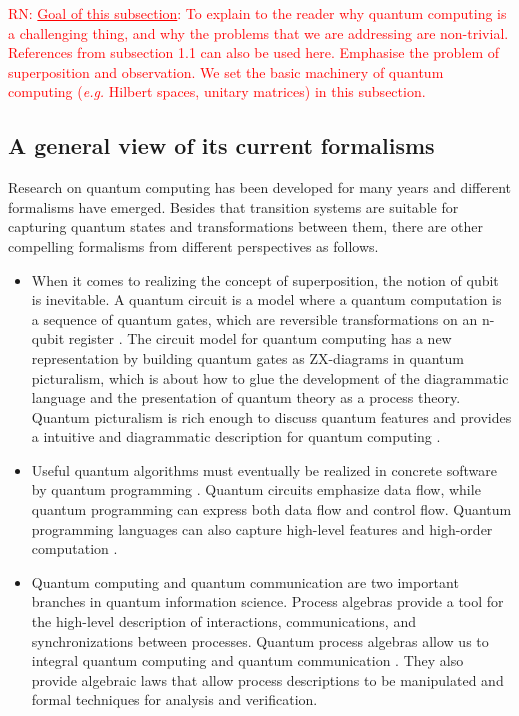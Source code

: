 \documentclass[a4paper, 11pt]{article}
\newcommand{\nevComment}[1]{\textcolor{red}{RN: #1}}
\begin{document}
\nevComment{\underline{Goal of this subsection}: To explain to the
  reader why quantum computing is a challenging thing, and why the
  problems that we are addressing are non-trivial. References from
  subsection 1.1 can also be used here.  Emphasise the problem of
  superposition and observation. We set the basic machinery of quantum
  computing (\emph{e.g.} Hilbert spaces, unitary matrices) in this subsection.}

\subsection{A general view of its current formalisms}

Research on quantum computing has been developed for many years and different formalisms have emerged. Besides that transition systems are suitable for capturing quantum states and transformations between them, there are other compelling formalisms from different perspectives as follows.
\begin{itemize} 
\item When it comes to realizing the concept of superposition, the notion of qubit is inevitable. A quantum circuit is a model where a quantum computation is a sequence of quantum gates, which are reversible transformations on an n-qubit register \cite{nielsen2002quantum, NM08}. The circuit model for quantum computing has a new representation by building quantum gates as ZX-diagrams in quantum picturalism, which is about how to glue the development of the diagrammatic language and the presentation of quantum theory as a process theory. Quantum picturalism is rich enough to discuss quantum features and provides a intuitive and diagrammatic description for quantum computing \cite{BA17}.  
\item Useful quantum algorithms must eventually be realized in concrete software by quantum programming \cite{ying16}. Quantum circuits emphasize data flow, while quantum programming can express both data flow and control flow. Quantum programming languages can also capture high-level features and high-order computation \cite{selinger04,hasuo17}.
\item Quantum computing and quantum communication are two important branches in quantum information science. Process algebras provide a tool for the high-level description of interactions, communications, and synchronizations between processes. Quantum process algebras allow us to integral quantum computing and quantum communication \cite{jorrand04,ying09}. They also provide algebraic laws that allow process descriptions to be manipulated and formal techniques for  analysis and verification. 
\end{itemize}
\end{document}
